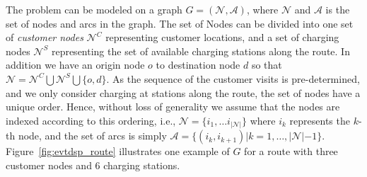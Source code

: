\documentclass[3p,11pt,authoryear]{elsarticle}  %
\begin{document}
The problem can be modeled on a graph $G = (\mathcal{N}, \mathcal{A})$, where $\mathcal{N}$ and $\mathcal{A}$ is the set of nodes and arcs in the graph. The set of Nodes can be divided into one set of \textit{customer nodes} $\mathcal{N}^C$ representing customer locations, and a set of charging nodes $\mathcal{N}^S$ representing the set of available charging stations along the route. In addition we have an origin node $o$ to destination node $d$ so that $\mathcal{N} = \mathcal{N}^C \bigcup \mathcal{N}^S \bigcup \{o,d\}$. As the sequence of the customer visits is pre-determined, and we only consider charging at stations along the route, the set of nodes have a unique order. Hence, without loss of generality we assume that the nodes are indexed according to this ordering, i.e., $\mathcal{N} = \{i_1,\ldots i_{|\mathcal{N}|}\}$ where $i_k$ represents the $k$-th node, and the set of arcs is simply $\mathcal{A} = \{(i_k, i_{k+1}) | k = 1,\ldots, |\mathcal{N}|-1\}$.
Figure~\ref{fig:evtdsp_route} illustrates one example of $G$ for a route with three customer nodes and 6 charging stations. %
\end{document}
